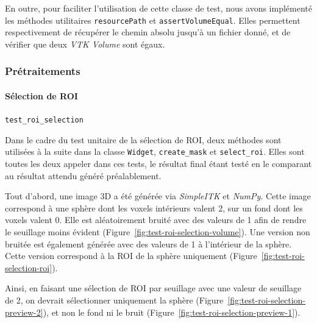 \documentclass{article}
\newcommand{\subsubsubsection}[1]{\paragraph{#1}\par\noindent\bigskip}
\newcommand{\method}[1]{\hspace{1in}\texttt{#1}\bigskip}
\begin{document}
{{        En outre, pour faciliter l'utilisation de cette classe de test, nous avons implémenté les méthodes utilitaires \texttt{resourcePath} et \texttt{assertVolumeEqual}. Elles permettent respectivement de récupérer le chemin absolu jusqu'à un fichier donné, et de vérifier que deux \textit{VTK Volume} sont égaux.

        {
            \subsubsection{Prétraitements}
            \label{subsubsec:preprocessing-unit-testing}

            {
                \subsubsubsection{Sélection de ROI}
                \label{subsubsubsec:roi-selection-unit-testing}

                \method{test\_roi\_selection}
                \label{method:test_roi_selection}

                Dans le cadre du test unitaire de la sélection de ROI, deux méthodes sont utilisées à la suite dans la classe \texttt{Widget}, \texttt{create\_mask} et \texttt{select\_roi}. Elles sont toutes les deux appeler dans ces tests, le résultat final étant testé en le comparant au résultat attendu généré préalablement.

                \bigskip

                Tout d'abord, une image 3D a été générée via \textit{SimpleITK} et \textit{NumPy}. Cette image correspond à une sphère dont les voxels intérieurs valent 2, sur un fond dont les voxels valent 0. Elle est aléatoirement bruité avec des valeurs de 1 afin de rendre le seuillage moins évident (Figure~\ref{fig:test-roi-selection-volume}).  Une version non bruitée est également générée avec des valeurs de 1 à l'intérieur de la sphère. Cette version correspond à la ROI de la sphère uniquement (Figure~\ref{fig:test-roi-selection-roi}).

                Ainsi, en faisant une sélection de ROI par seuillage avec une valeur de seuillage de 2, on devrait sélectionner uniquement la sphère (Figure~\ref{fig:test-roi-selection-preview-2}), et non le fond ni le bruit (Figure~\ref{fig:test-roi-selection-preview-1}).

                \begin{figure}[!p]
                    \centering


\end{figure}}}}}
\end{document}
